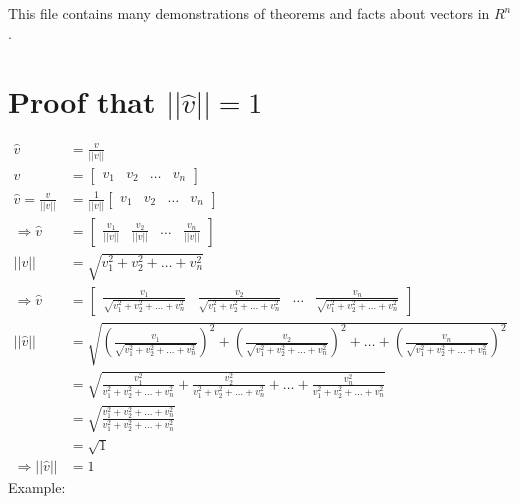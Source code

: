 \documentclass{article}
\begin{document}
This file contains many demonstrations of theorems and facts about vectors in $R^n$.
\section{Proof that $||\hat{v}|| = 1$}
\begin{equation}
    \begin{split}
        \hat{v} & = \frac{v}{||v||} \\
        v & = \begin{bmatrix}
            v_1 & v_2 & \dots & v_n
        \end{bmatrix} \\
        \hat{v} = \frac{v}{||v||} & = \frac{1}{||v||} \begin{bmatrix}
            v_1 & v_2 & \dots & v_n
        \end{bmatrix} \\
        \Longrightarrow \hat{v} & = \begin{bmatrix}
            \frac{v_1}{||v||} & \frac{v_2}{||v||} & \dots & \frac{v_n}{||v||}
        \end{bmatrix} \\
        ||v|| & = \sqrt{v_1^2 + v_2^2 + \dots + v_n^2} \\
        \Longrightarrow \hat{v} & = \begin{bmatrix}
            \frac{v_1}{\sqrt{v_1^2 + v_2^2 + \dots + v_n^2}} & \frac{v_2}{\sqrt{v_1^2 + v_2^2 + \dots + v_n^2}} & \dots & \frac{v_n}{\sqrt{v_1^2 + v_2^2 + \dots + v_n^2}}
        \end{bmatrix} \\
        ||\hat{v}|| & = \sqrt{(\frac{v_1}{\sqrt{v_1^2 + v_2^2 + \dots + v_n^2}})^2 + (\frac{v_2}{\sqrt{v_1^2 + v_2^2 + \dots + v_n^2}})^2 + \dots + (\frac{v_n}{\sqrt{v_1^2 + v_2^2 + \dots + v_n^2}})^2} \\
        & = \sqrt{\frac{v_1^2}{v_1^2 + v_2^2 + \dots + v_n^2} + \frac{v_2^2}{v_1^2 + v_2^2 + \dots + v_n^2} + \dots + \frac{v_n^2}{v_1^2 + v_2^2 + \dots + v_n^2}} \\
        & = \sqrt{\frac{v_1^2 + v_2^2 + \dots + v_n^2}{v_1^2 + v_2^2 + \dots + v_n^2}} \\
        & = \sqrt{1} \\
        \Longrightarrow ||\hat{v}|| & = 1
    \end{split}
\end{equation}
Example:
\end{document}
